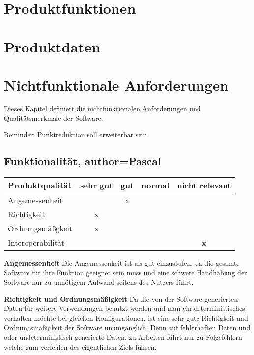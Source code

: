 \documentclass[parskip=full]{scrartcl} %
\begin{document}
\section{Produktfunktionen}
\newpage



\section{Produktdaten}
\newpage



\section{Nichtfunktionale Anforderungen}

Dieses Kapitel definiert die nichtfunktionalen Anforderungen und Qualitätsmerkmale der Software.

Reminder: Punktreduktion soll erweiterbar sein



\subsection{Funktionalität, author=Pascal}

\begin{tabular}{|l| c| c| c| c|}
    \hline
        Produktqualität & sehr gut & gut & normal & nicht relevant \\
    \hline
        Angemessenheit & & x & &\\
    \hline
        Richtigkeit & x & & &\\
    \hline
        Ordnungsmäßgkeit & x & & &\\
    \hline
        Interoperabilität & & & & x\\
    \hline
        
    \end{tabular}

\textbf{Angemessenheit}
\newline
Die Angemessenheit ist als gut einzustufen, da die gesamte Software für ihre Funktion geeignet sein muss und eine schwere Handhabung der Software nur zu unnötigem Aufwand seitens des Nutzers führt.

\textbf{Richtigkeit und Ordnungsmäßigkeit}
\newline
Da die von der Software generierten Daten für weitere Verwendungen benutzt werden und man ein deterministisches verhalten möchte bei gleichen Konfigurationen, ist eine sehr gute Richtigkeit und Ordnungsmäßigkeit der Software unumgänglich. Denn auf fehlerhaften Daten und oder undeterministisch generierte Daten, zu Arbeiten führt nur zu Folgefehlern welche zum verfehlen des eigentlichen Ziels führen.
\end{document}
